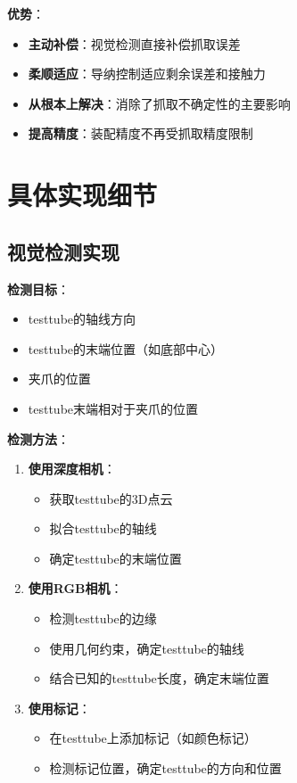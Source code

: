 \documentclass[12pt,a4paper]{article}
\begin{document}
\textbf{优势}：
\begin{itemize}
\item \textbf{主动补偿}：视觉检测直接补偿抓取误差
\item \textbf{柔顺适应}：导纳控制适应剩余误差和接触力
\item \textbf{从根本上解决}：消除了抓取不确定性的主要影响
\item \textbf{提高精度}：装配精度不再受抓取精度限制
\end{itemize}

\section{具体实现细节}

\subsection{视觉检测实现}

\textbf{检测目标}：
\begin{itemize}
\item testtube的轴线方向
\item testtube的末端位置（如底部中心）
\item 夹爪的位置
\item testtube末端相对于夹爪的位置
\end{itemize}

\textbf{检测方法}：
\begin{enumerate}
\item \textbf{使用深度相机}：
\begin{itemize}
\item 获取testtube的3D点云
\item 拟合testtube的轴线
\item 确定testtube的末端位置
\end{itemize}

\item \textbf{使用RGB相机}：
\begin{itemize}
\item 检测testtube的边缘
\item 使用几何约束，确定testtube的轴线
\item 结合已知的testtube长度，确定末端位置
\end{itemize}

\item \textbf{使用标记}：
\begin{itemize}
\item 在testtube上添加标记（如颜色标记）
\item 检测标记位置，确定testtube的方向和位置
\end{itemize}
\end{enumerate}
\end{document}
